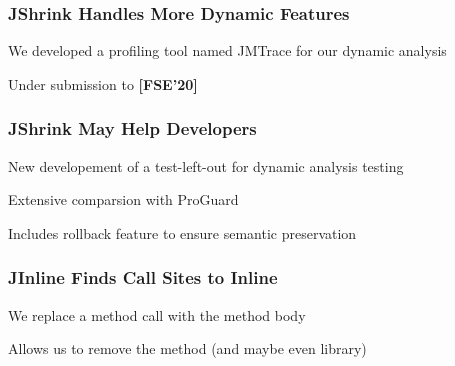 \documentclass[aspectratio=169]{beamer}
\begin{document}
  \begin{frame}
    \frametitle{JShrink Handles More Dynamic Features}


    \vspace{-2em}

    We developed a profiling tool named JMTrace for our dynamic analysis

    Under submission to \textbf{[FSE'20]}
  \end{frame}

  \begin{frame}
    \frametitle{JShrink May Help Developers}

    New developement of a test-left-out for dynamic analysis testing

    \vspace{2em}

    Extensive comparsion with ProGuard

    \vspace{2em}

    Includes rollback feature to ensure semantic preservation
  \end{frame}

  \begin{frame}[fragile]
    \frametitle{JInline Finds Call Sites to Inline}

    We replace a method call with the method body

    \vspace{2em}

    Allows us to remove the method (and maybe even library)

  \end{frame}
\end{document}

